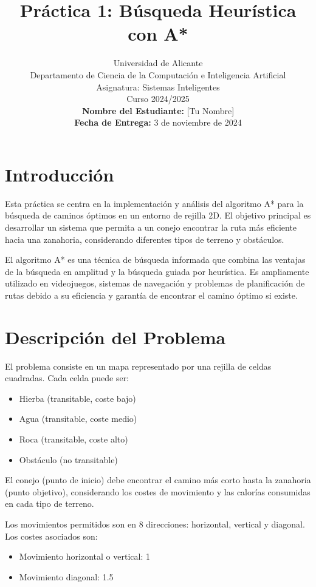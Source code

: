 \documentclass[a4paper,12pt]{article}
\title{Práctica 1: Búsqueda Heurística con A*}
\author{
	Universidad de Alicante\\
	Departamento de Ciencia de la Computación e Inteligencia Artificial\\
	Asignatura: Sistemas Inteligentes\\
	Curso 2024/2025\\
	\textbf{Nombre del Estudiante:} [Tu Nombre]\\
	\textbf{Fecha de Entrega:} 3 de noviembre de 2024
}
\date{}
\begin{document}
	
	\maketitle
	
	\newpage
	
	\tableofcontents
	
	\newpage
	
	\section{Introducción}
	Esta práctica se centra en la implementación y análisis del algoritmo A* para la búsqueda de caminos óptimos en un entorno de rejilla 2D. El objetivo principal es desarrollar un sistema que permita a un conejo encontrar la ruta más eficiente hacia una zanahoria, considerando diferentes tipos de terreno y obstáculos.
	
	El algoritmo A* es una técnica de búsqueda informada que combina las ventajas de la búsqueda en amplitud y la búsqueda guiada por heurística. Es ampliamente utilizado en videojuegos, sistemas de navegación y problemas de planificación de rutas debido a su eficiencia y garantía de encontrar el camino óptimo si existe.
	
	\section{Descripción del Problema}
	El problema consiste en un mapa representado por una rejilla de celdas cuadradas. Cada celda puede ser:
	\begin{itemize}
		\item Hierba (transitable, coste bajo)
		\item Agua (transitable, coste medio)
		\item Roca (transitable, coste alto)
		\item Obstáculo (no transitable)
	\end{itemize}
	
	El conejo (punto de inicio) debe encontrar el camino más corto hasta la zanahoria (punto objetivo), considerando los costes de movimiento y las calorías consumidas en cada tipo de terreno.
	
	Los movimientos permitidos son en 8 direcciones: horizontal, vertical y diagonal. Los costes asociados son:
	\begin{itemize}
		\item Movimiento horizontal o vertical: 1
		\item Movimiento diagonal: 1.5
	\end{itemize}
	
\end{document}
